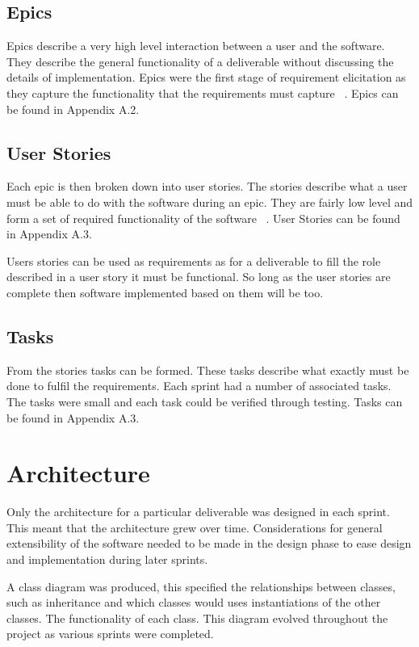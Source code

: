 \documentclass{UoYCSproject}
\begin{document}
\subsection{Epics}
Epics describe a very high level interaction between a user and the software. They describe the general functionality of a deliverable without discussing the details of implementation. Epics were the first stage of requirement elicitation as they capture the functionality that the requirements must capture ~\parencite{cohn2004user}. Epics can be found in Appendix A.2.

\subsection{User Stories}
Each epic is then broken down into user stories. The stories describe what a user must be able to do with the software during an epic. They are fairly low level and form a set of required functionality of the software ~\parencite{cohn2004user}. User Stories can be found in Appendix A.3.

Users stories can be used as requirements as for a deliverable to fill the role described in a user story it must be functional. So long as the user stories are complete then software implemented based on them will be too.

\subsection{Tasks}
From the stories tasks can be formed. These tasks describe what exactly must be done to fulfil the requirements. Each sprint had a number of associated tasks. The tasks were small and each task could be verified through testing. Tasks can be found in Appendix A.3. 

\section{Architecture}
Only the architecture for a particular deliverable was designed in each sprint. This meant that the architecture grew over time. Considerations for general extensibility of the software needed to be made in the design phase to ease design and implementation during later sprints.

A class diagram was produced, this specified the relationships between classes, such as inheritance and which classes would uses instantiations of the other classes.  The functionality of each class. This diagram evolved throughout the project as various sprints were completed.
\end{document}

